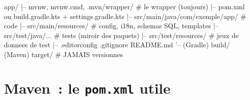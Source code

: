 \documentclass[12pt,a4paper,twoside,openright]{book}
\begin{document}
\begin{codeplain}
app/
|-- mvnw, mvnw.cmd, .mvn/wrapper/          # le wrapper (toujours)
|-- pom.xml            ou   build.gradle.kts + settings.gradle.kts
|-- src/main/java/com/exemple/app/         # code
|-- src/main/resources/                    # config, i18n, schemas SQL, templates
|-- src/test/java/...                       # tests (miroir des paquets)
|-- src/test/resources/                      # jeux de donnees de test
|-- .editorconfig  .gitignore  README.md
'-- (Gradle) build/    (Maven) target/       # JAMAIS versionnes
\end{codeplain}

\section{Maven~: le \texttt{pom.xml} utile}
\end{document}
